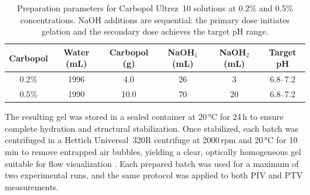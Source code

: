 \documentclass{iopjournal}
\begin{document}
\begin{table}[htb]
\centering
\caption{Preparation parameters for Carbopol Ultrez~10 solutions at 0.2\% and 0.5\%
concentrations. NaOH additions are sequential: the primary dose initiates gelation
and the secondary dose achieves the target pH range.}
\label{tab:carbopol_prep}
\begin{tabular}{c S[table-format=4.0] S[table-format=2.1]
                S[table-format=2.0] S[table-format=2.0] c}
\toprule
\textbf{Carbopol} &
{\textbf{Water (mL)}} &
{\textbf{Carbopol (g)}} &
{\textbf{NaOH$_1$ (mL)}} &
{\textbf{NaOH$_2$ (mL)}} &
\textbf{Target pH} \\
\% & 1996 & 4.0  & 26 &  3 & 6.8--7.2 \\
0.5\% & 1990 & 10.0 & 70 & 20 & 6.8--7.2 \\
\bottomrule
\end{tabular}
\end{table}

The resulting gel was stored in a sealed container at 20\,°C for 24\,h to ensure
complete hydration and structural stabilization. Once stabilized, each batch was
centrifuged in a Hettich Universal~320R centrifuge at 2000\,rpm and 20\,°C for
10\,min to remove entrapped air bubbles, yielding a clear, optically homogeneous
gel suitable for flow visualization \cite{Tapia2025}. Each prepared batch was used
for a maximum of two experimental runs, and the same protocol was applied to both
PIV and PTV measurements.
\end{document}
